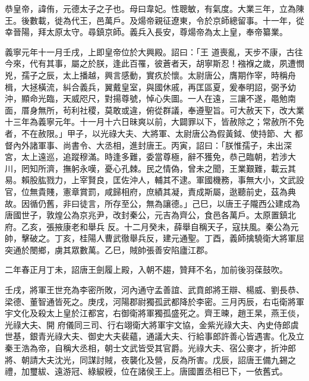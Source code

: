
\begin{pinyinscope}

 恭皇帝，諱侑，元德太子之子也。母曰韋妃。性聰敏，有氣度。大業三年，立為陳王。後數載，徙為代王，邑萬戶。及煬帝親征遼東，令於京師總留事。十一年，從幸晉陽，拜太原太守。尋鎮京師。義兵入長安，尊煬帝為太上皇，奉帝纂業。



 義寧元年十一月壬戌，上即皇帝位於大興殿。詔曰：「王
 道喪亂，天步不康，古往今來，代有其事，屬之於朕，逢此百罹，彼蒼者天，胡寧斯忍！襁褓之歲，夙遭憫兇，孺子之辰，太上播越，興言感動，實疚於懷。太尉唐公，膺期作宰，時稱舟楫，大拯橫流，糾合義兵，翼戴皇室，與國休戚，再匡區夏，爰奉明詔，弼予幼沖，顯命光臨，天威咫尺，對揚尊號，悼心失圖。一人在遠，三讓不遂，黽勉南面，厝身無所，茍利社稷，莫敢或違，俯從群議，奉遵聖旨。可大赦天下，改大業十三年為義寧元年。十一月十六日昧爽以前，大闢罪以下，皆赦除之；常赦所不免者，不在赦限。」甲子，以光祿大夫、大將軍、太尉唐公為假黃鉞、使持節、大
 都督內外諸軍事、尚書令、大丞相，進封唐王。丙寅，詔曰：「朕惟孺子，未出深宮，太上遠巡，追蹤穆滿。時逢多難，委當尊極，辭不獲免，恭己臨朝，若涉大川，罔知所濟，撫躬永嘆，憂心孔棘。民之情偽，曾未之聞，王業艱難，載云其易。賴股肱戮力，上宰賢良，匡佐沖人，輔其不逮。軍國機務，事無大小，文武設官，位無貴賤，憲章賞罰，咸歸相府，庶績其凝，責成斯屬，逖聽前史，茲為典故。因循仍舊，非曰徒言，所存至公，無為讓德。」己巳，以唐王子隴西公建成為唐國世子，敦煌公為京兆尹，改封秦公，元吉為齊公，食邑各萬戶。太原置鎮北府。乙亥，張掖康老和舉兵
 反。十二月癸未，薛舉自稱天子，寇扶風。秦公為元帥，擊破之。丁亥，桂陽人曹武徹舉兵反，建元通聖。丁酉，義師擒驍衛大將軍屈突通於閿鄉，虜其眾數萬。乙巳，賊帥張善安陷廬江郡。



 二年春正月丁未，詔唐王劍履上殿，入朝不趨，贊拜不名，加前後羽葆鼓吹。



 壬戌，將軍王世充為李密所敗，河內通守孟善誼、武賁郎將王辯、楊威、劉長恭、梁德、董智通皆死之。庚戌，河陽郡尉獨孤武都降於李密。三月丙辰，右屯衛將軍宇文化及殺太上皇於江都宮，右御衛將軍獨孤盛死之。齊王暕，趙王杲，燕王倓，光祿大夫、開
 府儀同三司、行右翊衛大將軍宇文協，金紫光祿大夫、內史侍郎虞世基，銀青光祿大夫、御史大夫裴蘊，通議大夫、行給事郎許善心皆遇害。化及立秦王浩為帝，自稱大丞相，朝士文武皆受其官爵。光祿大夫、宿公麥才，折沖郎將、朝請大夫沈光，同謀討賊，夜襲化及營，反為所害。戊辰，詔唐王備九錫之禮，加璽紱、遠游冠、綠綟綬，位在諸侯王上。唐國置丞相已下，一依舊式。




\end{pinyinscope}
